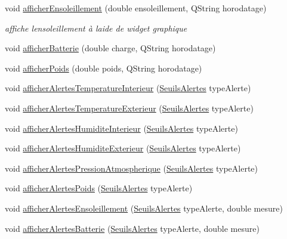 \begin{DoxyCompactItemize}
void \hyperlink{class_ruche_ihm_a8ee0041a209452e8e77f4a50adabff2b}{afficher\+Ensoleillement} (double ensoleillement, Q\+String horodatage)
\begin{DoxyCompactList}\small\item\em affiche l\textquotesingle{}ensoleillement à l\textquotesingle{}aide de widget graphique \end{DoxyCompactList}\item 
void \hyperlink{class_ruche_ihm_a3934082a49b22f4c6096d96887a11591}{afficher\+Batterie} (double charge, Q\+String horodatage)
\item 
void \hyperlink{class_ruche_ihm_a840ab51f951632e630f92e6c0b5ecc4d}{afficher\+Poids} (double poids, Q\+String horodatage)
\item 
void \hyperlink{class_ruche_ihm_af4848134f2bc17d9772f2408a068e9d8}{afficher\+Alertes\+Temperature\+Interieur} (\hyperlink{parametres_8h_aaa6de8207c94675264c90b10b613368d}{Seuils\+Alertes} type\+Alerte)
\item 
void \hyperlink{class_ruche_ihm_ada4be5a54f7fa57de6190d44e3cfcb82}{afficher\+Alertes\+Temperature\+Exterieur} (\hyperlink{parametres_8h_aaa6de8207c94675264c90b10b613368d}{Seuils\+Alertes} type\+Alerte)
\item 
void \hyperlink{class_ruche_ihm_abfe91b271dde97048bb218b04c9e167b}{afficher\+Alertes\+Humidite\+Interieur} (\hyperlink{parametres_8h_aaa6de8207c94675264c90b10b613368d}{Seuils\+Alertes} type\+Alerte)
\item 
void \hyperlink{class_ruche_ihm_a76b73e39e55443fc7b9bb773eac3321f}{afficher\+Alertes\+Humidite\+Exterieur} (\hyperlink{parametres_8h_aaa6de8207c94675264c90b10b613368d}{Seuils\+Alertes} type\+Alerte)
\item 
void \hyperlink{class_ruche_ihm_abea08b19d4f52f6767a8618bbc25d956}{afficher\+Alertes\+Pression\+Atmospherique} (\hyperlink{parametres_8h_aaa6de8207c94675264c90b10b613368d}{Seuils\+Alertes} type\+Alerte)
\item 
void \hyperlink{class_ruche_ihm_a641d05346e527c3386ed9df6a7e6fafc}{afficher\+Alertes\+Poids} (\hyperlink{parametres_8h_aaa6de8207c94675264c90b10b613368d}{Seuils\+Alertes} type\+Alerte)
\item 
void \hyperlink{class_ruche_ihm_aea5efc506f9825db2a4eb39a40d7eb18}{afficher\+Alertes\+Ensoleillement} (\hyperlink{parametres_8h_aaa6de8207c94675264c90b10b613368d}{Seuils\+Alertes} type\+Alerte, double mesure)
\item 
void \hyperlink{class_ruche_ihm_a5181062e21dc73908b660d97e9621fb6}{afficher\+Alertes\+Batterie} (\hyperlink{parametres_8h_aaa6de8207c94675264c90b10b613368d}{Seuils\+Alertes} type\+Alerte, double mesure)

\end{DoxyCompactItemize}
